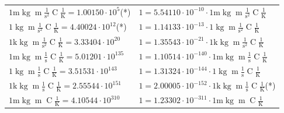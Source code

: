 \begin{center}
\begin{longtable}{l l}
{\color{gray}$1 \bm{\mathrm{ m}}\operatorname{kg}{\operatorname{m}}\frac1{\operatorname{s}^2}{\operatorname{C}}\frac1{\operatorname{K}} = 1.00150\cdot10^{5} $}\quad(*) & {\color{gray}$ 1 = 5.54110\cdot10^{-10} \cdot 1 \bm{\mathrm{ m}}\operatorname{kg}{\operatorname{m}}\frac1{\operatorname{s}^2}{\operatorname{C}}\frac1{\operatorname{K}}$}  \\
{\color{black}$1 \bm{\mathrm{ }}\operatorname{kg}{\operatorname{m}}\frac1{\operatorname{s}^2}{\operatorname{C}}\frac1{\operatorname{K}} = 4.40024\cdot10^{12} $}\quad(*) & {\color{black}$ 1 = 1.14133\cdot10^{-13} \cdot 1 \bm{\mathrm{ }}\operatorname{kg}{\operatorname{m}}\frac1{\operatorname{s}^2}{\operatorname{C}}\frac1{\operatorname{K}}$}  \\
{\color{gray}$1 \bm{\mathrm{ k}}\operatorname{kg}{\operatorname{m}}\frac1{\operatorname{s}^2}{\operatorname{C}}\frac1{\operatorname{K}} = 3.33404\cdot10^{20} $}   & {\color{gray}$ 1 = 1.35543\cdot10^{-21} \cdot 1 \bm{\mathrm{ k}}\operatorname{kg}{\operatorname{m}}\frac1{\operatorname{s}^2}{\operatorname{C}}\frac1{\operatorname{K}}$}  \\
{\color{gray}$1 \bm{\mathrm{ m}}\operatorname{kg}{\operatorname{m}}\frac1{\operatorname{s}}{\operatorname{C}}\frac1{\operatorname{K}} = 5.01201\cdot10^{135} $}   & {\color{gray}$ 1 = 1.10514\cdot10^{-140} \cdot 1 \bm{\mathrm{ m}}\operatorname{kg}{\operatorname{m}}\frac1{\operatorname{s}}{\operatorname{C}}\frac1{\operatorname{K}}$}  \\
{\color{black}$1 \bm{\mathrm{ }}\operatorname{kg}{\operatorname{m}}\frac1{\operatorname{s}}{\operatorname{C}}\frac1{\operatorname{K}} = 3.51531\cdot10^{143} $}   & {\color{black}$ 1 = 1.31324\cdot10^{-144} \cdot 1 \bm{\mathrm{ }}\operatorname{kg}{\operatorname{m}}\frac1{\operatorname{s}}{\operatorname{C}}\frac1{\operatorname{K}}$}  \\
{\color{gray}$1 \bm{\mathrm{ k}}\operatorname{kg}{\operatorname{m}}\frac1{\operatorname{s}}{\operatorname{C}}\frac1{\operatorname{K}} = 2.55544\cdot10^{151} $}   & {\color{gray}$ 1 = 2.00005\cdot10^{-152} \cdot 1 \bm{\mathrm{ k}}\operatorname{kg}{\operatorname{m}}\frac1{\operatorname{s}}{\operatorname{C}}\frac1{\operatorname{K}}$}\quad(*)\\
{\color{gray}$1 \bm{\mathrm{ m}}\operatorname{kg}{\operatorname{m}}{}{\operatorname{C}}\frac1{\operatorname{K}} = 4.10544\cdot10^{310} $}   & {\color{gray}$ 1 = 1.23302\cdot10^{-311} \cdot 1 \bm{\mathrm{ m}}\operatorname{kg}{\operatorname{m}}{}{\operatorname{C}}\frac1{\operatorname{K}}$}  \\

\end{longtable}
\end{center}
